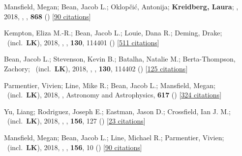 \item[{\color{numcolor}\scriptsize25}] Mansfield, Megan; Bean, Jacob L.; Oklop{\v{c}}i{\'c}, Antonija; \textbf{Kreidberg, Laura}; \etal, 2018, , \apj, \textbf{868} () [\href{https://ui.adsabs.harvard.edu/abs/2018ApJ...868L..34M}{90 citations}]

\item[{\color{numcolor}\scriptsize24}] Kempton, Eliza M.-R.; Bean, Jacob L.; Louie, Dana R.; Deming, Drake; \etal\ (incl.\ \textbf{LK}), 2018, , \pasp, \textbf{130}, 114401 () [\href{https://ui.adsabs.harvard.edu/abs/2018PASP..130k4401K}{511 citations}]

\item[{\color{numcolor}\scriptsize23}] Bean, Jacob L.; Stevenson, Kevin B.; Batalha, Natalie M.; Berta-Thompson, Zachory; \etal\ (incl.\ \textbf{LK}), 2018, , \pasp, \textbf{130}, 114402 () [\href{https://ui.adsabs.harvard.edu/abs/2018PASP..130k4402B}{125 citations}]

\item[{\color{numcolor}\scriptsize22}] Parmentier, Vivien; Line, Mike R.; Bean, Jacob L.; Mansfield, Megan; \etal\ (incl.\ \textbf{LK}), 2018, , Astronomy and Astrophysics, \textbf{617} () [\href{https://ui.adsabs.harvard.edu/abs/2018A&A...617A.110P}{324 citations}]

\item[{\color{numcolor}\scriptsize21}] Yu, Liang; Rodriguez, Joseph E.; Eastman, Jason D.; Crossfield, Ian J. M.; \etal\ (incl.\ \textbf{LK}), 2018, , \aj, \textbf{156}, 127 () [\href{https://ui.adsabs.harvard.edu/abs/2018AJ....156..127Y}{23 citations}]

\item[{\color{numcolor}\scriptsize20}] Mansfield, Megan; Bean, Jacob L.; Line, Michael R.; Parmentier, Vivien; \etal\ (incl.\ \textbf{LK}), 2018, , \aj, \textbf{156}, 10 () [\href{https://ui.adsabs.harvard.edu/abs/2018AJ....156...10M}{90 citations}]


